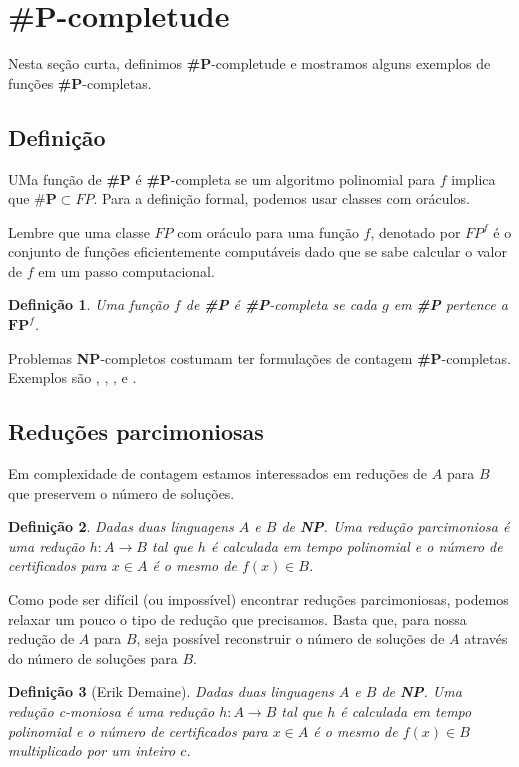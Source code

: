 \documentclass[paper=a4, fontsize=11pt]{scrartcl} %
\newtheorem{definition}{Definição}
\numberwithin{equation}{subsection}
\numberwithin{figure}{subsection}
\numberwithin{table}{subsection}
\numberwithin{definition}{subsection}
\numberwithin{theorem}{subsection}
\numberwithin{property}{subsection}
\numberwithin{proposition}{subsection}
\newcommand{\SP}{\textbf{\#P}\xspace}
\newcommand{\NP}{\textbf{NP}\xspace}
\newcommand{\FP}{\textbf{FP}\xspace}
\newcommand{\prob}[1]{\text{\textsc{\textbf{#1}}}}
\begin{document}
\pagebreak
\section{\SP-completude}

Nesta seção curta, definimos \SP-completude e mostramos alguns exemplos de funções \SP-completas. 

\subsection{Definição}

UMa função de \SP é \SP-completa se um algoritmo polinomial para $f$ implica que $\SP \subset FP$. Para a definição formal, podemos usar classes com oráculos.

Lembre que uma classe $FP$ com oráculo para uma função $f$, denotado por $FP^f$ é o conjunto de funções eficientemente computáveis dado que se sabe calcular o valor de $f$ em um passo computacional.

\begin{definition}
Uma função $f$ de \SP é \SP-completa se cada $g$ em \SP pertence a $\FP^f$.
\end{definition}

Problemas \NP-completos costumam ter formulações de contagem \SP-completas. Exemplos são \prob{\#Sat}, \prob{\#3Sat}, \prob{\#Clique}, e \prob{\#Ham}.

\subsection{Reduções parcimoniosas}

Em complexidade de contagem estamos interessados em reduções de $A$ para $B$ que preservem o número de soluções. 

\begin{definition}
Dadas duas linguagens $A$ e $B$ de \NP. Uma redução parcimoniosa é uma redução $h: A \rightarrow B$ tal que $h$ é calculada em tempo polinomial e o número de certificados para $x \in A$ é o mesmo de $f(x) \in B$.
\end{definition}

Como pode ser difícil (ou impossível) encontrar reduções parcimoniosas, podemos relaxar um pouco o tipo de redução que precisamos. Basta que, para nossa redução de $A$ para $B$, seja possível reconstruir o número de soluções de $A$ através do número de soluções para $B$.

\begin{definition}[Erik Demaine]
Dadas duas linguagens $A$ e $B$ de \NP. Uma redução c-moniosa é uma redução $h: A \rightarrow B$ tal que $h$ é calculada em tempo polinomial e o número de certificados para $x \in A$ é o mesmo de $f(x) \in B$ multiplicado por um inteiro $c$.
\end{definition}
\end{document}
